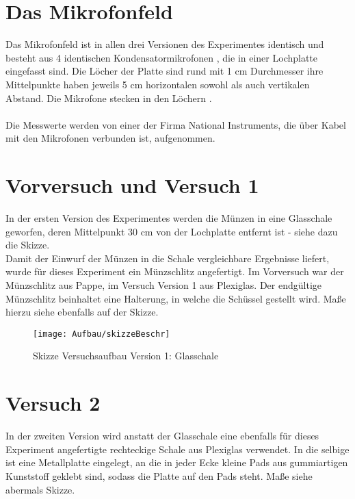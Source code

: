 \section{Das Mikrofonfeld}
Das Mikrofonfeld ist in allen drei Versionen des Experimentes identisch und besteht aus 4 identischen Kondensatormikrofonen , die in einer Lochplatte eingefasst sind. Die Löcher der Platte sind rund mit 1 cm Durchmesser ihre Mittelpunkte haben jeweils 5 cm horizontalen sowohl als auch vertikalen Abstand. Die Mikrofone stecken in den Löchern . \\
 \\
Die Messwerte werden von einer  der Firma National Instruments, die über Kabel mit den Mikrofonen verbunden ist, aufgenommen.

\newpage

\section{Vorversuch und Versuch 1}

In der ersten Version des Experimentes werden die Münzen in eine Glasschale geworfen, deren Mittelpunkt 30 cm von der Lochplatte entfernt ist - siehe dazu die Skizze. \\ 
Damit der Einwurf der Münzen in die Schale vergleichbare Ergebnisse liefert, wurde für dieses Experiment ein Münzschlitz angefertigt. Im Vorversuch war der Münzschlitz aus Pappe, im Versuch Version 1 aus 
Plexiglas. Der endgültige Münzschlitz beinhaltet eine Halterung, in welche die Schüssel gestellt wird. Maße hierzu siehe ebenfalls auf der Skizze.

\begin{figure}[h]
\centering
\texttt{[image: Aufbau/skizzeBeschr]}
\caption{Skizze Versuchsaufbau Version 1: Glasschale}
\label{fig:Versuchsaufbau Version 1}
\end{figure}

\newpage

\section{Versuch 2}

In der zweiten Version wird anstatt der Glasschale eine ebenfalls für dieses Experiment angefertigte rechteckige Schale aus Plexiglas verwendet. In die selbige ist eine Metallplatte eingelegt, an die in jeder Ecke kleine Pads aus gummiartigen Kunststoff geklebt sind, sodass die Platte auf den Pads steht. Maße siehe abermals Skizze.\\

